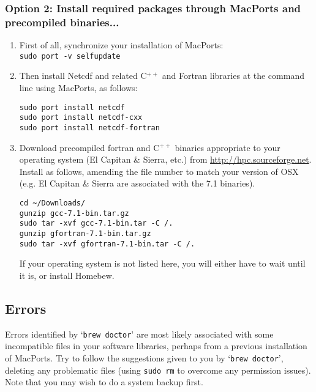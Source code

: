 \documentclass[11pt,fleqn]{book} %
\begin{document}
%
\subsubsection*{Option 2: Install required packages through MacPorts and precompiled binaries...}

\begin{enumerate}

\item First of all, synchronize your installation of MacPorts:
\\\texttt{sudo port -v selfupdate} 

\item Then install Netcdf and related C\(^{++}\) and Fortran libraries at the command line using MacPorts, as follows:

\vspace{-5pt}\begin{verbatim}
sudo port install netcdf
sudo port install netcdf-cxx
sudo port install netcdf-fortran
\end{verbatim}

\item Download precompiled fortran and C\(^{++}\)  binaries appropriate to your operating system (El Capitan \& Sierra, etc.) from \href{http://hpc.sourceforge.net}{http://hpc.sourceforge.net}. Install as follows, amending the file number to match your version of OSX (e.g. El Capitan \& Sierra are associated with the 7.1 binaries).

\vspace{-5pt}\begin{verbatim}
cd ~/Downloads/
gunzip gcc-7.1-bin.tar.gz
sudo tar -xvf gcc-7.1-bin.tar -C /.
gunzip gfortran-7.1-bin.tar.gz 
sudo tar -xvf gfortran-7.1-bin.tar -C /.
\end{verbatim}

If your operating system is not listed here, you will either have to wait until it is, or install Homebew.

\end{enumerate}

%
\subsection*{Errors}\label{how-to-macports-errors}

Errors identified by `\texttt{brew doctor}' are most likely associated with some incompatible files in your software libraries, perhaps from a previous installation of MacPorts. Try to follow the suggestions given to you by `\texttt{brew doctor}', deleting any problematic files (using \texttt{sudo rm} to overcome any permission issues). Note that you may wish to do a system backup first.
\end{document}
